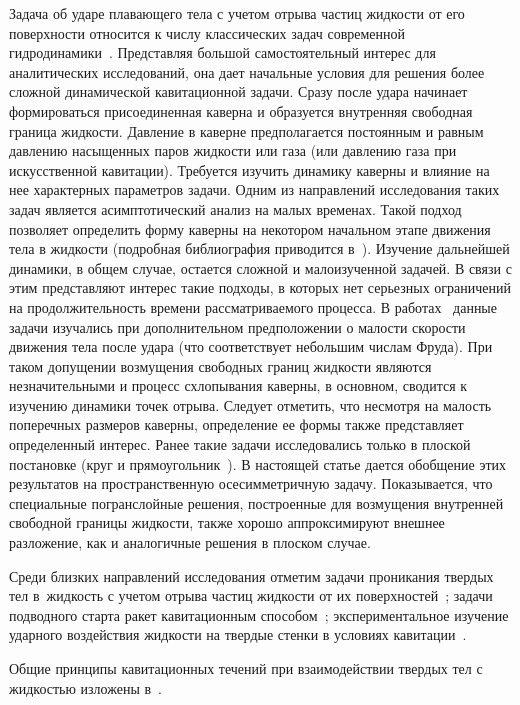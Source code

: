 \documentclass[press]{vestnik}
\begin{document}
Задача об ударе плавающего тела с учетом отрыва частиц жидкости от его 
поверхности относится к числу классических задач современной гидродинамики~\cite{B01}. Представляя большой самостоятельный интерес для аналитических 
исследований, она дает начальные условия для решения более сложной 
динамической кавитационной задачи. Сразу после удара начинает формироваться 
присоединенная каверна и образуется внутренняя свободная граница жидкости. 
Давление в каверне предполагается постоянным и равным давлению насыщенных 
паров жидкости или газа (или давлению газа при искусственной кавитации). 
Требуется изучить динамику каверны и влияние на нее характерных параметров 
задачи. Одним из направлений исследования таких задач является 
асимптотический анализ на малых временах. Такой подход позволяет определить 
форму каверны на некотором начальном этапе движения тела в жидкости 
(подробная библиография приводится в~\cite{B02}). Изучение дальнейшей динамики, в 
общем случае, остается сложной и малоизученной задачей. В связи с этим 
представляют интерес такие подходы, в которых нет серьезных ограничений на 
продолжительность времени рассматриваемого процесса. В работах~\cite{B03,B04} данные 
задачи изучались при дополнительном предположении о малости скорости 
движения тела после удара (что соответствует небольшим числам Фруда). При 
таком допущении возмущения свободных границ жидкости являются 
незначительными и процесс схлопывания каверны, в основном, сводится к 
изучению динамики точек отрыва. Следует отметить, что несмотря на малость 
поперечных размеров каверны, определение ее формы также представляет 
определенный интерес. Ранее такие задачи исследовались только в плоской 
постановке (круг и прямоугольник~\cite{B03,B04}). В настоящей статье дается обобщение 
этих результатов на пространственную осесимметричную задачу. Показывается, 
что специальные погранслойные решения, построенные для возмущения внутренней 
свободной границы жидкости, также хорошо аппроксимируют внешнее разложение, 
как и аналогичные решения в плоском случае. 

Среди близких направлений исследования отметим задачи проникания твердых тел 
в~жидкость с учетом отрыва частиц жидкости от их поверхностей~\cite{B05}; задачи 
подводного старта ракет кавитационным способом~\cite{B06}; экспериментальное 
изучение ударного воздействия жидкости на твердые стенки в условиях 
кавитации~\cite{B07,B08}. 

Общие принципы кавитационных течений при взаимодействии твердых тел с 
жидкостью изложены в~\cite{B09,B10}. 
\end{document}
